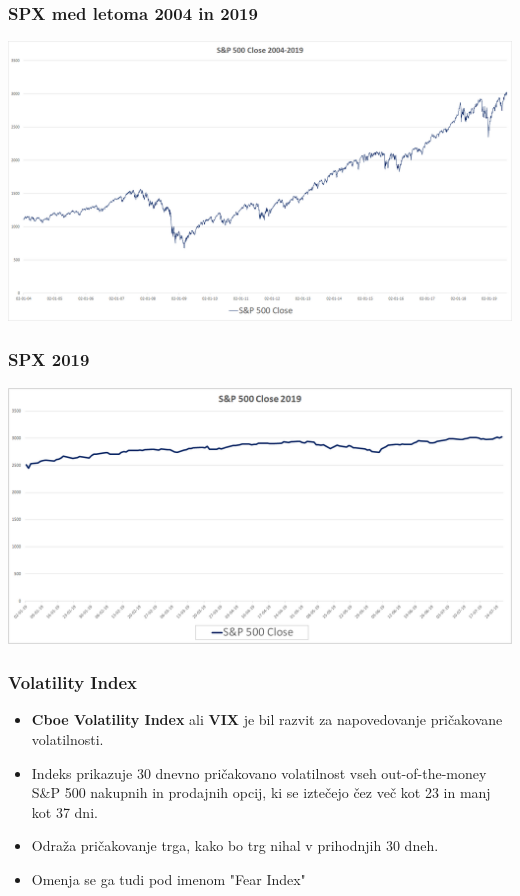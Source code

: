 \documentclass[10pt]{beamer}
\begin{document}
\begin{frame}
\frametitle{SPX med letoma 2004 in 2019}
\includegraphics[width=1\textwidth]{./Grafi/SPX 2004-2019.png}
\end{frame}

\begin{frame}
\frametitle{SPX 2019}
\includegraphics[width=1\textwidth]{./Grafi/SPX 2019.png}
\end{frame}

\begin{frame}
\frametitle{Volatility Index}
\begin{itemize}
\item \textbf{Cboe Volatility Index} ali \textbf{VIX} je bil razvit za napovedovanje pričakovane volatilnosti.
\item Indeks prikazuje 30 dnevno pričakovano volatilnost vseh out-of-the-money S\&P 500 nakupnih in prodajnih opcij, ki se iztečejo čez več kot 23 in manj kot 37 dni. 
\item Odraža pričakovanje trga, kako bo trg nihal v prihodnjih 30 dneh.
\item Omenja se ga tudi pod imenom "Fear Index"
\end{itemize}
\end{frame}
\end{document}

